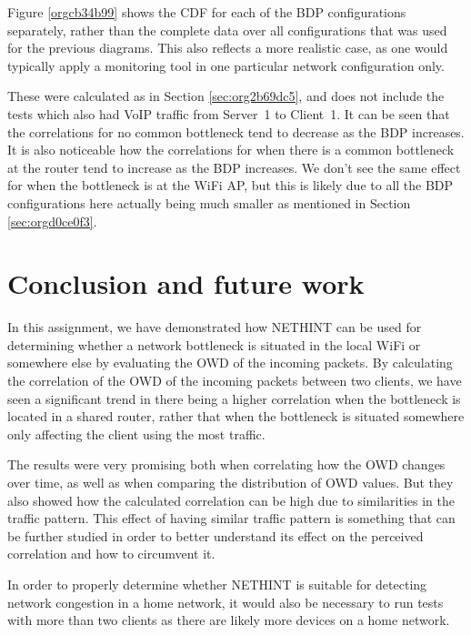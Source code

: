 \documentclass[a4paper,11pt]{article}
\begin{document}
Figure \ref{orgcb34b99} shows the CDF for each of the BDP configurations separately, rather than the complete data over all configurations that was used for the previous diagrams. This also reflects a more realistic case, as one would typically apply a monitoring tool in one particular network configuration only.

These were calculated as in Section \ref{sec:org2b69dc5}, and does not include the tests which also had VoIP traffic from Server~1 to Client~1. It can be seen that the correlations for no common bottleneck tend to decrease as the BDP increases. It is also noticeable how the correlations for when there is a common bottleneck at the router tend to increase as the BDP increases. We don't see the same effect for when the bottleneck is at the WiFi AP, but this is likely due to all the BDP configurations here actually being much smaller as mentioned in Section \ref{sec:orgd0ce0f3}.
\section{Conclusion and future work}
\label{sec:org05432af}
In this assignment, we have demonstrated how NETHINT can be used for determining whether a network bottleneck is situated in the local WiFi or somewhere else by evaluating the OWD of the incoming packets. By calculating the correlation of the OWD of the incoming packets between two clients, we have seen a significant trend in there being a higher correlation when the bottleneck is located in a shared router, rather that when the bottleneck is situated somewhere only affecting the client using the most traffic.

The results were very promising both when correlating how the OWD changes over time, as well as when comparing the distribution of OWD values. But they also showed how the calculated correlation can be high due to similarities in the traffic pattern. This effect of having similar traffic pattern is something that can be further studied in order to better understand its effect on the perceived correlation and how to circumvent it.

In order to properly determine whether NETHINT is suitable for detecting network congestion in a home network, it would also be necessary to run tests with more than two clients as there are likely more devices on a home network.
\end{document}
